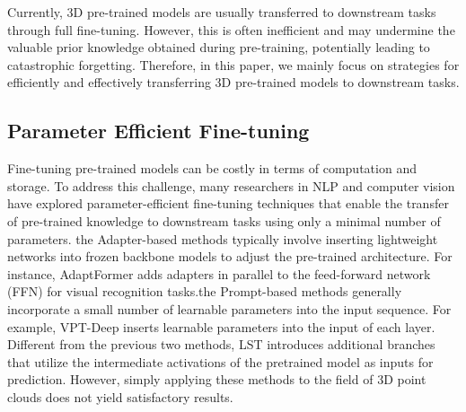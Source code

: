 Currently, 3D pre-trained models are usually transferred to downstream tasks through full fine-tuning. However, this is often inefficient and may undermine the valuable prior knowledge obtained during pre-training, potentially leading to catastrophic forgetting. Therefore, in this paper, we mainly focus on strategies for efficiently and effectively transferring 3D pre-trained models to downstream tasks.

\subsection{Parameter Efficient Fine-tuning}

Fine-tuning pre-trained models can be costly in terms of computation and storage. To address this challenge, many researchers in NLP and computer vision have explored parameter-efficient fine-tuning techniques that enable the transfer of pre-trained knowledge to downstream tasks using only a minimal number of parameters. the Adapter-based methods\cite{houlsby2019parameter,hu2021lora,chen2022adaptformer} typically involve inserting lightweight networks into frozen backbone models to adjust the pre-trained architecture. For instance, AdaptFormer\cite{chen2022adaptformer} adds adapters in parallel to the feed-forward network (FFN) for visual recognition tasks.the Prompt-based methods\cite{li2021prefix, jia2022visual} generally incorporate a small number of learnable parameters into the input sequence. For example, VPT-Deep\cite{jia2022visual} inserts learnable parameters into the input of each layer. Different from the previous two methods, LST\cite{sung2022lst} introduces additional branches that utilize the intermediate activations of the pretrained model as inputs for prediction. However, simply applying these methods to the field of 3D point clouds does not yield satisfactory results.

